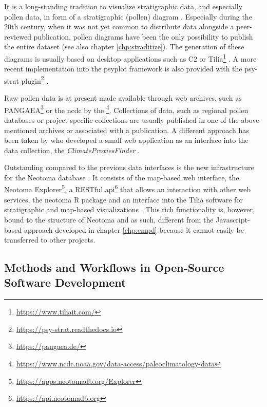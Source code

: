 \documentclass[
11pt, %
english, %
singlespacing, %
headsepline, %
]{MastersDoctoralThesis} %
\begin{document}
\begin{NoHyper}
\begin{refsection}
It is a long-standing tradition to visualize stratigraphic data, and especially pollen data, in form of a stratigraphic (pollen) diagram \citep{Bradley1985, Grimm1988}. Especially during the 20th century, when it was not yet common to distribute data alongside a peer-reviewed publication, pollen diagrams have been the only possibility to publish the entire dataset (see also chapter \ref{chp:straditize}). The generation of these diagrams is usually based on desktop applications such as C2 \citep{Juggins2007} or Tilia\footnote{\url{https://www.tiliait.com/}} \citep{Grimm1988, Grimm1991}. A more recent implementation into the psyplot framework \citep[chapter \ref{chp:psyplot}]{Sommer2017} is also provided with the psy-strat plugin\footnote{\url{https://psy-strat.readthedocs.io}} \citep{Sommer2019}.

Raw pollen data is at present made available through web archives, such as PANGAEA\footnote{\url{https://pangaea.de/}} or the \gls{ncdc} by the \footnote{\url{https://www.ncdc.noaa.gov/data-access/paleoclimatology-data}}. Collections of data, such as regional pollen databases or project specific collections \citep[e.g.][]{WhitmoreGajewskiSawadaEtAl2005, DavisZanonCollinsEtAl2013} are usually published in one of the above-mentioned archives or associated with a publication. A different approach has been taken by \cite{BollietBrockmannMassonDelmotteEtAl2016} who developed a small web application as an interface into the data collection, the \textit{ClimateProxiesFinder} \citep[chapter \ref{chp:empd}]{Brockmann2016}.

Outstanding compared to the previous data interfaces is the new infrastructure for the Neotoma database \citep{WilliamsGrimmBloisEtAl2018}. It consists of the map-based web interface, the Neotoma Explorer\footnote{\url{https://apps.neotomadb.org/Explorer}}, a RESTful api\footnote{\url{https://api.neotomadb.org}} that allows an interaction with other web services, the neotoma R package \citep{GoringDawsonSimpsonEtAl2015} and an interface into the Tilia software for stratigraphic and map-based visualizations \citep{WilliamsGrimmBloisEtAl2018}. This rich functionality is, however, bound to the structure of Neotoma and as such, different from the Javascript-based approach developed in chapter \ref{chp:empd} because it cannot easily be transferred to other projects.


\subsection{Methods and Workflows in Open-Source Software Development} \label{sec:intro-software-tools}


\end{refsection}
\end{NoHyper}
\end{document}
